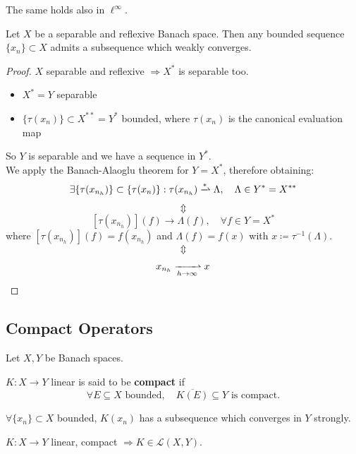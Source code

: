 \begin{remark}
The same holds also in $\ell^\infty$.
\end{remark}

\clearpage
\begin{corollary}
Let $X$ be a separable and reflexive Banach space. Then any bounded sequence $\{x_n\} \subset X$ admits a subsequence which weakly converges.
\end{corollary}

\begin{proof}
$X$ separable and reflexive $\Rightarrow X^*$ is separable too.
\begin{itemize}
\item $X^* = Y$ separable
\item $\{\tau(x_n)\} \subset X^{**} = Y^*$ bounded, where $\tau(x_n)$ is the canonical evaluation map
\end{itemize}

So $Y$ is separable and we have a sequence in $Y^*$. \\
We apply the Banach-Alaoglu theorem for $Y = X^*$, therefore obtaining:
\[
\exists \{\tau(x_{n_h})\} \subset \{\tau(x_n)\} : \tau(x_{n_h}) \xrightharpoonup{\ast} \Lambda, \quad \Lambda \in Y^* = X^{**}
\]
\[
\Updownarrow
\]
\[
[\tau(x_{n_h})](f) \to \Lambda(f), \quad \forall f \in Y = X^*
\]
where $[\tau(x_{n_h})](f) = f(x_{n_h})$ and $\Lambda(f) = f(x)$ with $x \coloneqq \tau^{-1}(\Lambda)$.
\[
\Updownarrow
\]
\[
x_{n_h} \xrightharpoonup[h \to \infty]{} x
\]
\end{proof}

\subsection{Compact Operators}

Let $X, Y$ be Banach spaces.

\begin{definition}
$K: X \to Y$ linear is said to be \textbf{compact} if
\[
\forall E \subseteq X \text{ bounded}, \quad \overline{K(E)} \subseteq Y \text{ is compact}.
\]
\end{definition}

\begin{remark}
$\forall \{x_n\} \subset X$ bounded, $K(x_n)$ has a subsequence which converges in $Y$ strongly.
\end{remark}

\begin{theorem}
$K: X \to Y$ linear, compact $\Rightarrow K \in \mathcal{L}(X, Y)$.
\end{theorem}

